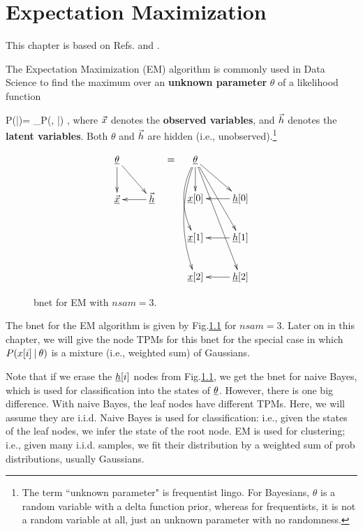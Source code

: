 \chapter{Expectation Maximization}
\label{ch-emax}

This chapter is based on 
Refs.\cite{wiki-em}
and \cite{emory-biostat}.

The Expectation Maximization (EM) 
algorithm 
is commonly used in Data Science 
to find the maximum
over an {\bf unknown parameter} $\theta$ of a
 likelihood function 

\beq
P(\vecx|\theta)=
\sum_\vech P(\vecx, \vech|\theta)
\;,
\eeq
where ${\vec{x}}$
denotes the {\bf observed variables},
and ${\vec{h}}$ denotes the
{\bf latent variables}.
Both $\theta$
and ${\vec{h}}$
are hidden (i.e.,
unobserved).\footnote{
The term
``unknown parameter"
is frequentist lingo.
For Bayesians, $\theta$
is a random variable with
a delta function prior,
whereas for frequentists,
it is not
a random variable at all, 
just an unknown parameter
with no randomness.}



\begin{figure}[h!]
\centering
$$\begin{array}{ccc}
\xymatrix{
\ul{\theta}\ar[d]\ar[dr]
\\
\ul{\vecx}&\ul{\vech}\ar[l]
}
&=&
\xymatrix{
\ul{\theta}
\ar[d]
\ar@/_1pc/[dd]
\ar@/_1pc/[ddd]
\ar[rd]\ar[rdd]\ar[rddd]
\\
\rvx[0]
&\rvh[0]\ar[l]
\\
\rvx[1]
&\rvh[1]\ar[l]
\\
\rvx[2]
&\rvh[2]\ar[l]
}
\end{array}
$$
\caption{bnet for EM with $nsam=3$.}
\label{fig-em-bnet}
\end{figure}


The bnet for the EM algorithm
is given by Fig.\ref{fig-em-bnet}
for $nsam=3$.
Later on in this chapter,
we will give the node TPMs
for this bnet for
the special
case in which $P(x[i]{\:\mathbf{|}\:} \theta)$
is a mixture (i.e., weighted sum)
of Gaussians.

Note that if we 
erase the ${\underline{h}}[i]$ nodes
from Fig.\ref{fig-em-bnet},
we get the bnet for naive Bayes,
which is used for classification
into the states of $\underline{\theta}$.
However, there is one big
difference. 
With naive Bayes,
the leaf nodes have
different TPMs.
Here, we will assume they are i.i.d.
Naive Bayes is used for classification: i.e., 
given the states 
of the leaf nodes,
we infer the state of the root node.
EM is used for clustering; i.e.,
given many i.i.d. samples,
we fit their distribution by a weighted sum
of prob distributions,
usually Gaussians.

